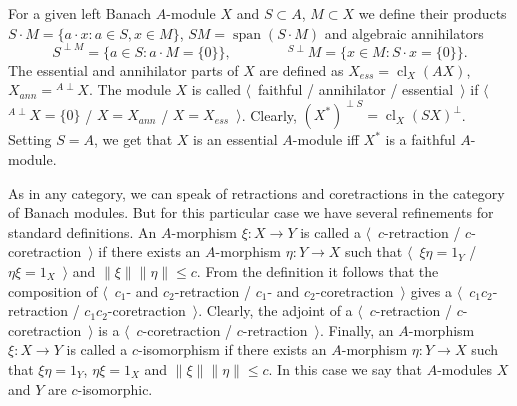 For a given left Banach $A$-module $X$ and $S\subset A$, $M\subset X$ we define 
their products $S\cdot M= \{a\cdot x:a\in S, x\in M \}$, 
$SM=\operatorname{span} (S\cdot M)$ and algebraic annihilators 
\[
S^{\perp M}= \{a\in S:a\cdot M= \{0 \} \},
\qquad\qquad
{}^{S\perp}M= \{x\in M: S\cdot x= \{0 \} \}.
\] 
The essential and annihilator
parts of $X$ are defined as $X_{ess}=\operatorname{cl}_X(A X)$,
$X_{ann}={}^{A\perp}X$. The module $X$ is called $\langle$~faithful /
annihilator / essential~$\rangle$ if $\langle$~${}^{A\perp}X= \{0 \}$ /
$X=X_{ann}$ / $X=X_{ess}$~$\rangle$. Clearly, 
${(X^*)}^{\perp S}={\operatorname{cl}_X(S X)}^\perp$. Setting $S=A$, we get that 
$X$ is an essential $A$-module iff $X^*$ is a faithful $A$-module.

As in any category, we can speak of retractions and coretractions in the
category of Banach modules. But for this particular case we have several
refinements for standard definitions. An $A$-morphism $\xi:X\to Y$ is called
a $\langle$~$c$-retraction / $c$-coretraction~$\rangle$ if there exists an
$A$-morphism $\eta:Y\to X$ such that $\langle$~$\xi\eta=1_Y$ /
$\eta\xi=1_X$~$\rangle$ and $\lVert\xi\rVert\lVert\eta\rVert\leq c$. From the
definition it follows that the composition of $\langle$~$c_1$- and $c_2$-retraction
/ $c_1$- and $c_2$-coretraction~$\rangle$ gives a $\langle$~$c_1c_2$-retraction
/ $c_1c_2$-coretraction~$\rangle$. Clearly, the adjoint of
a $\langle$~$c$-retraction / $c$-coretraction~$\rangle$ is a
$\langle$~$c$-coretraction / $c$-retraction~$\rangle$. Finally, an $A$-morphism
$\xi:X\to Y$ is called a $c$-isomorphism if there exists an $A$-morphism
$\eta:Y\to X$ such that $\xi\eta=1_Y$, $\eta\xi=1_X$ and
$\lVert\xi\rVert\lVert\eta\rVert\leq c$. In this case we say that $A$-modules $X$
and $Y$ are $c$-isomorphic.

